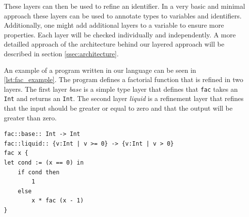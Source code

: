 \documentclass[acmsmall, review, screen]{acmart}
\begin{document}
These layers can then be used to refine an identifier. In a very basic and minimal approach these layers can be used to annotate types to variables and identifiers. Additionally, one might add additional layers to a variable to ensure more properties. Each layer will be checked individually and independently. A more detailled approach of the architecture behind our layered approach will be described in section \ref{ssec:architecture}.

An example of a program written in our language can be seen in \ref{lst:fac_example}. The program defines a factorial function that is refined in two layers. The first layer \textit{base} is a simple type layer that defines that \texttt{fac} takes an \texttt{Int} and returns an \texttt{Int}. The second layer \textit{liquid} is a refinement layer that refines that the input should be greater or equal to zero and that the output will be greater than zero.

\begin{lstlisting}[caption={Example of a factorial function in our simple language}, label={lst:fac_example}]
fac::base:: Int -> Int
fac::liquid:: {v:Int | v >= 0} -> {v:Int | v > 0}
fac x { 
let cond := (x == 0) in
	if cond then 
		1 
	else 
		x * fac (x - 1) 
}
\end{lstlisting}
\end{document}
